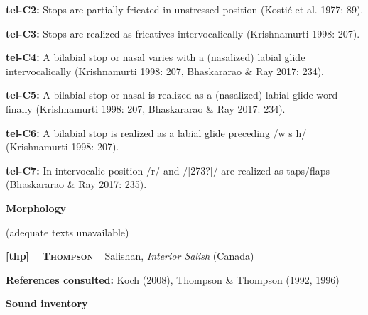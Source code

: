\begin{styleBody}
\textbf{tel-C2: }Stops are partially fricated in unstressed position (Kostić et al. 1977: 89).
\end{styleBody}

\begin{styleBody}
\textbf{tel-C3: }Stops are realized as fricatives intervocalically (Krishnamurti 1998: 207).
\end{styleBody}

\begin{styleBody}
\textbf{tel-C4: }A bilabial stop or nasal varies with a (nasalized) labial glide intervocalically (Krishnamurti 1998: 207, Bhaskararao \& Ray 2017: 234).
\end{styleBody}

\begin{styleBody}
\textbf{tel-C5: }A bilabial stop or nasal is realized as a (nasalized) labial glide word-finally (Krishnamurti 1998: 207, Bhaskararao \& Ray 2017: 234).
\end{styleBody}

\begin{styleBody}
\textbf{tel-C6: }A bilabial stop is realized as a labial glide preceding /w s h/ (Krishnamurti 1998: 207).
\end{styleBody}

\begin{styleBody}
\textbf{tel-C7: }In intervocalic position /r/ and /[273?]/ are realized as taps/flaps (Bhaskararao \& Ray 2017: 235).
\end{styleBody}

\begin{styleBody}
\textbf{Morphology}
\end{styleBody}

\begin{styleBody}
(adequate texts unavailable)
\end{styleBody}

\clearpage\begin{styleBody}
\textbf{[thp] }\ \ \textbf{\textsc{Thompson}}\textbf{\ \ }Salishan, \textit{Interior Salish} (Canada)
\end{styleBody}

\begin{styleBody}
\textbf{References consulted: }Koch (2008), Thompson \& Thompson (1992, 1996)
\end{styleBody}

\begin{styleBody}
\textbf{Sound inventory}
\end{styleBody}

